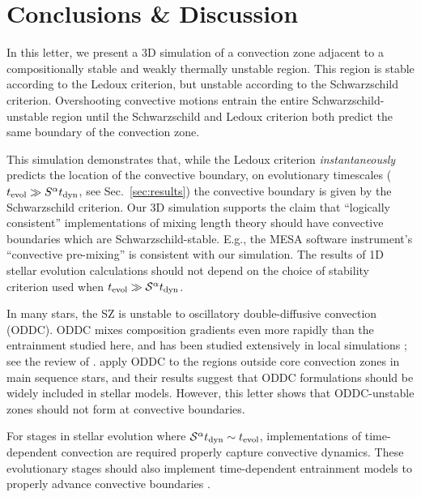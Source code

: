 \section{Conclusions \& Discussion}
\label{sec:conclusions}

In this letter, we present a 3D simulation of a convection zone adjacent to a compositionally stable and weakly thermally unstable region.
This region is stable according to the Ledoux criterion, but unstable according to the Schwarzschild criterion.
Overshooting convective motions entrain the entire Schwarzschild-unstable region until the Schwarzschild and Ledoux criterion both predict the same boundary of the convection zone.

This simulation demonstrates that, while the Ledoux criterion \emph{instantaneously} predicts the location of the convective boundary, on evolutionary timescales ($t_{\rm{evol}} \gg S^{\alpha} t_{\rm{dyn}}$, see Sec.~\ref{sec:results}) the convective boundary is given by the Schwarzschild criterion.
Our 3D simulation supports the claim that ``logically consistent'' implementations of mixing length theory \citep{gabriel_etal_2014, mesa4, mesa5} should have convective boundaries which are Schwarzschild-stable.
E.g., the MESA software instrument's ``convective pre-mixing'' \citep[CPM,][]{mesa5} is consistent with our simulation.
The results of 1D stellar evolution calculations should not depend on the choice of stability criterion used when $t_{\rm{evol}} \gg \mathcal{S}^{\alpha} t_{\rm{dyn}}$.

In many stars, the SZ is unstable to oscillatory double-diffusive convection (ODDC).
ODDC mixes composition gradients even more rapidly than the entrainment studied here, and has been studied extensively in local simulations \citep{mirouh_etal_2012, wood_etal_2013, xie_etal_2017}; see the review of \citet{garaud_2018}.
\citet{moore_garaud_2016} apply ODDC to the regions outside core convection zones in main sequence stars, and their results suggest that ODDC formulations should be widely included in stellar models.
However, this letter shows that ODDC-unstable zones should not form at convective boundaries.

For stages in stellar evolution where $\mathcal{S}^{\alpha} t_{\rm{dyn}} \sim t_{\rm{evol}}$, implementations of time-dependent convection \citep[TDC,][]{tdc_1986} are required properly capture convective dynamics.
These evolutionary stages should also implement time-dependent entrainment models to properly advance convective boundaries \citep[e.g.,][]{turner_1968, fuentes_cumming_2020}.

